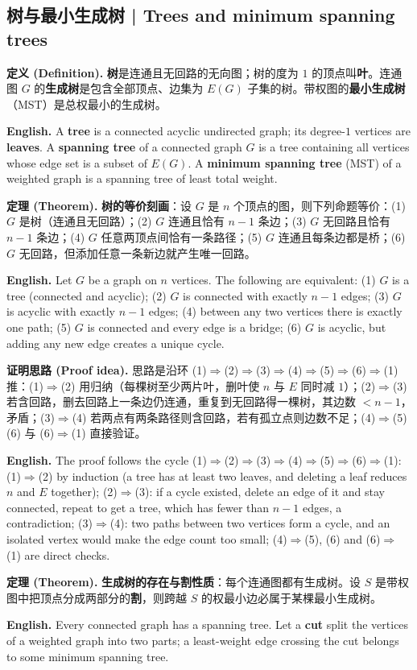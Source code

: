 \documentclass[UTF8,11pt,a4paper]{ctexart}
\newcommand{\EN}[1]{\par\noindent \textbf{English.} #1\par}
\newcommand{\DEF}[2]{\par\noindent\textbf{定义 (Definition).} #1\par\EN{#2}}
\newcommand{\THM}[2]{\par\noindent\textbf{定理 (Theorem).} #1\par\EN{#2}}
\newcommand{\PRF}[2]{\par\noindent\textbf{证明思路 (Proof idea).} #1\par\EN{#2}}
\begin{document}
\subsection{树与最小生成树 | Trees and minimum spanning trees}
\DEF{\textbf{树}是连通且无回路的无向图；树的度为 $1$ 的顶点叫\textbf{叶}。连通图 $G$ 的\textbf{生成树}是包含全部顶点、边集为 $E(G)$ 子集的树。带权图的\textbf{最小生成树}（MST）是总权最小的生成树。}{A \textbf{tree} is a connected acyclic undirected graph; its degree-$1$ vertices are \textbf{leaves}. A \textbf{spanning tree} of a connected graph $G$ is a tree containing all vertices whose edge set is a subset of $E(G)$. A \textbf{minimum spanning tree} (MST) of a weighted graph is a spanning tree of least total weight.}
\THM{\textbf{树的等价刻画}：设 $G$ 是 $n$ 个顶点的图，则下列命题等价：(1) $G$ 是树（连通且无回路）；(2) $G$ 连通且恰有 $n-1$ 条边；(3) $G$ 无回路且恰有 $n-1$ 条边；(4) $G$ 任意两顶点间恰有一条路径；(5) $G$ 连通且每条边都是桥；(6) $G$ 无回路，但添加任意一条新边就产生唯一回路。}{Let $G$ be a graph on $n$ vertices. The following are equivalent: (1) $G$ is a tree (connected and acyclic); (2) $G$ is connected with exactly $n-1$ edges; (3) $G$ is acyclic with exactly $n-1$ edges; (4) between any two vertices there is exactly one path; (5) $G$ is connected and every edge is a bridge; (6) $G$ is acyclic, but adding any new edge creates a unique cycle.}
\PRF{思路是沿环 (1)$\Rightarrow$(2)$\Rightarrow$(3)$\Rightarrow$(4)$\Rightarrow$(5)$\Rightarrow$(6)$\Rightarrow$(1) 推：(1)$\Rightarrow$(2) 用归纳（每棵树至少两片叶，删叶使 $n$ 与 $E$ 同时减 $1$）；(2)$\Rightarrow$(3) 若含回路，删去回路上一条边仍连通，重复到无回路得一棵树，其边数 $<n-1$，矛盾；(3)$\Rightarrow$(4) 若两点有两条路径则含回路，若有孤立点则边数不足；(4)$\Rightarrow$(5)(6) 与 (6)$\Rightarrow$(1) 直接验证。}{The proof follows the cycle (1)$\Rightarrow$(2)$\Rightarrow$(3)$\Rightarrow$(4)$\Rightarrow$(5)$\Rightarrow$(6)$\Rightarrow$(1): (1)$\Rightarrow$(2) by induction (a tree has at least two leaves, and deleting a leaf reduces $n$ and $E$ together); (2)$\Rightarrow$(3): if a cycle existed, delete an edge of it and stay connected, repeat to get a tree, which has fewer than $n-1$ edges, a contradiction; (3)$\Rightarrow$(4): two paths between two vertices form a cycle, and an isolated vertex would make the edge count too small; (4)$\Rightarrow$(5), (6) and (6)$\Rightarrow$(1) are direct checks.}
\THM{\textbf{生成树的存在与割性质}：每个连通图都有生成树。设 $S$ 是带权图中把顶点分成两部分的\textbf{割}，则跨越 $S$ 的权最小边必属于某棵最小生成树。}{Every connected graph has a spanning tree. Let a \textbf{cut} split the vertices of a weighted graph into two parts; a least-weight edge crossing the cut belongs to some minimum spanning tree.}
\end{document}
